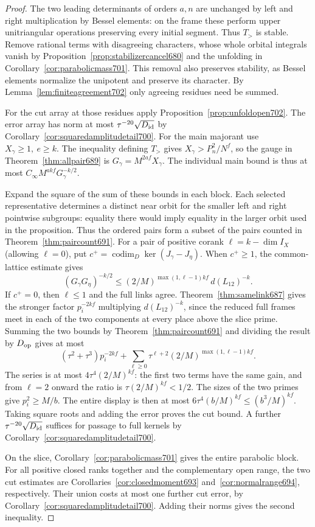 \documentclass[a4paper,11pt]{article}
\theoremstyle{definition}
\theoremstyle{remark}
\numberwithin{equation}{section}
\begin{document}
\begin{proof}
The two leading determinants of orders \(a,n\) are unchanged
by left and right multiplication by Bessel elements: on the
frame these perform upper unitriangular operations preserving
every initial segment. Thus \(T_>\) is stable. Remove rational
terms with disagreeing characters, whose whole orbital
integrals vanish by Proposition~\ref{prop:stabilizercancel680}
and the unfolding in Corollary~\ref{cor:parabolicmass701}.
This removal also preserves stability, as Bessel elements
normalize the unipotent and preserve its character. By
Lemma~\ref{lem:finiteagreement702} only agreeing residues
need be summed.

For the cut array at those residues apply
Proposition~\ref{prop:unfoldopen702}. The error array has norm
at most \(\tau^{-20}\sqrt{D_{\rm id}}\) by
Corollary~\ref{cor:squaredamplitudetail700}. For the main
majorant use \(X_\gamma\ge1,\ e\ge k\). The inequality defining
\(T_>\) gives \(X_\gamma>P_n^2/N^f\), so the gauge in
Theorem~\ref{thm:allpair689} is \(G_\gamma=M^{2af}X_\gamma\).
The individual main bound is thus at most
\(C_\infty M^{akf}G_\gamma^{-k/2}\).

Expand the square of the sum of these bounds in each block.
Each selected representative determines a distinct near orbit
for the smaller left and right pointwise subgroups: equality
there would imply equality in the larger orbit used in the
proposition. Thus the ordered pairs form a subset of the
pairs counted in Theorem~\ref{thm:paircount691}. For a pair
of positive corank \(\ell=k-\dim I_X\) (allowing \(\ell=0\)),
put \(c^+=\operatorname{codim}_D\ker(J_\gamma-J_\eta)\).
When \(c^+\ge1\), the common-lattice estimate gives
\[
 (G_\gamma G_\eta)^{-k/2}
 \le (2/M)^{\max(1,\ell-1)kf}\,d(L_{12})^{-k}.
\]
If \(c^+=0\), then \(\ell\le1\) and the full links agree.
Theorem~\ref{thm:samelink687} gives the stronger factor
\(p_i^{-2kf}\) multiplying \(d(L_{12})^{-k}\), since the
reduced full frames meet in each of the two components at
every place above the slice prime. Summing the two bounds by
Theorem~\ref{thm:paircount691} and dividing the result by
\(D_{\rm op}\) gives at most
\[
  (\tau^2+\tau^3)p_i^{-2kf}
  +\sum_{\ell\ge0}\tau^{\ell+2}
                       (2/M)^{\max(1,\ell-1)kf}.
\]
The series is at most \(4\tau^4(2/M)^{kf}\): the first
two terms have the same gain, and from \(\ell=2\) onward the
ratio is \(\tau(2/M)^{kf}<1/2\). The sizes of the two primes
give \(p_i^2\ge M/b\). The entire display is then at most
\(6\tau^4(b/M)^{kf}\le(b^3/M)^{kf}\). Taking square roots
and adding the error proves the cut bound. A further
\(\tau^{-20}\sqrt{D_{\rm id}}\) suffices for passage to full
kernels by Corollary~\ref{cor:squaredamplitudetail700}.

On the slice, Corollary~\ref{cor:parabolicmass701} gives the
entire parabolic block. For all positive closed ranks together
and the complementary open range, the two cut estimates are
Corollaries~\ref{cor:closedmoment693} and~\ref{cor:normalrange694},
respectively. Their union costs at most one further cut error,
by Corollary~\ref{cor:squaredamplitudetail700}. Adding their
norms gives the second inequality.
\end{proof}
\end{document}
